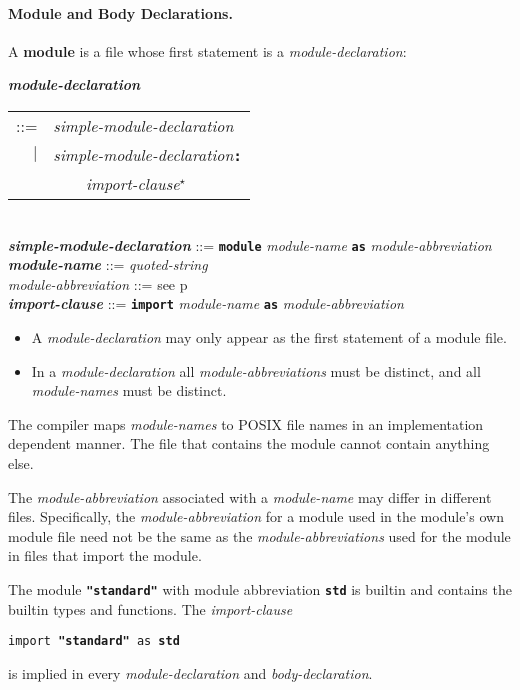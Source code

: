 \documentclass[12pt]{article}
\newcommand{\subsubsubsection}[1]{\paragraph[#1]{#1.}}
\newcommand{\TT}[1]{{\tt \bfseries #1}}
\newcommand{\STAR}{{\Large $^\star$}}
\newcommand{\key}[1]{{\rm \bfseries #1}}
\newcommand{\ttkey}[1]{{\tt \bfseries #1}}
\newcommand{\emkey}[1]{{\em \bfseries #1}}
\newcommand{\pagref}[1]{p\pageref{#1}}
\newenvironment{indpar}[1][0.3in]%
	{\begin{list}{}%
		     {\setlength{\itemsep}{0in}%
		      \setlength{\topsep}{0in}%
		      \setlength{\parsep}{1ex}%
		      \setlength{\labelwidth}{#1}%
		      \setlength{\leftmargin}{#1}%
		      \addtolength{\leftmargin}{\labelsep}}%
	 \item}%
	{\end{list}}
\begin{document}
\subsubsubsection{Module and Body Declarations}
\label{MODULE-AND-BODY-DECLARATIONS}

A \key{module} is a file whose first statement is a {\em module-declaration}:

\begin{indpar}
\emkey{module-declaration}\label{MODULE-DECLARATION}
    \begin{tabular}[t]{rl}
    ::= & {\em simple-module-declaration} \\
    $|$ & {\em simple-module-declaration}\TT{:} \\
	& \TT{~~~~}{\em import-clause}\STAR{} \\
    \end{tabular} \\
\emkey{simple-module-declaration} ::= \TT{module} {\em module-name}
        \TT{as} {\em module-abbreviation} \\
\emkey{module-name}\label{MODULE-NAME} ::= {\em quoted-string} \\
{\em module-abbreviation} ::= see \pagref{MODULE-ABBREVIATION} \\
\emkey{import-clause}\label{IMPORT-CLAUSE}
    ::= \ttkey{import} {\em module-name} \TT{as} {\em module-abbreviation}

\begin{itemize}

\item
A {\em module-declaration} may only appear as the first statement
of a module file.

\item
In a {\em module-declaration} all {\em module-abbreviations} must be
distinct, and all {\em module-names} must be distinct.
\end{itemize}
\end{indpar}

The compiler maps {\em module-names} to POSIX file names in an
implementation dependent manner.  The file that contains the
module cannot contain anything else.

The {\em module-abbreviation} associated with a {\em module-name}
may differ in different files.  Specifically, the {\em module-abbreviation}
for a module used in the module's own module file need not be the same
as the {\em module-abbreviations} used for the module in files
that import the module.

The module \TT{"standard"}\index{standard@\TT{"standard"}} with
module abbreviation \ttkey{std} is builtin and contains the builtin types and
functions.  The {\em import-clause}
\begin{center}
{\tt import }\TT{"standard"}{\tt{} as \ttkey{std}}
\end{center}
is implied in every {\em module-declaration} and
{\em body-declaration}.
\end{document}
